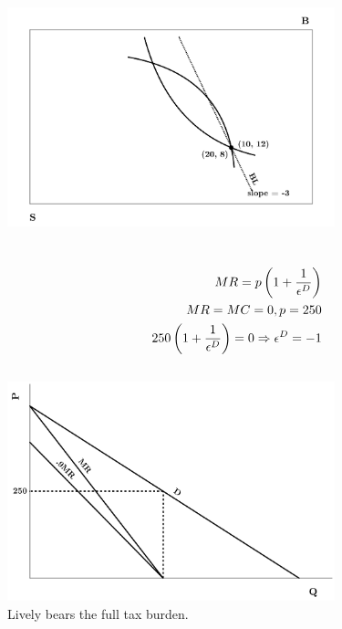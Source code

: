 \documentclass{article}
\begin{document}
	\subsection[g]{}
		\includegraphics[height=2.5in]{Charts/5g}
\section[6]{}
	\subsection[a]{}
		\begin{align}
		\setcounter{equation}{0}
			MR=p \left ( 1+ \frac{1}{\epsilon^D} \right ) \\
			MR=MC=0, p=250\\
			250 \left ( 1+ \frac{1}{\epsilon^D} \right ) = 0 \Rightarrow \epsilon^D = -1
		\end{align}
	\subsection[b]{}
		\includegraphics[height=2.5in]{Charts/6b}
		\\ Lively bears the full tax burden. 
\section[7]{}
\end{document}
